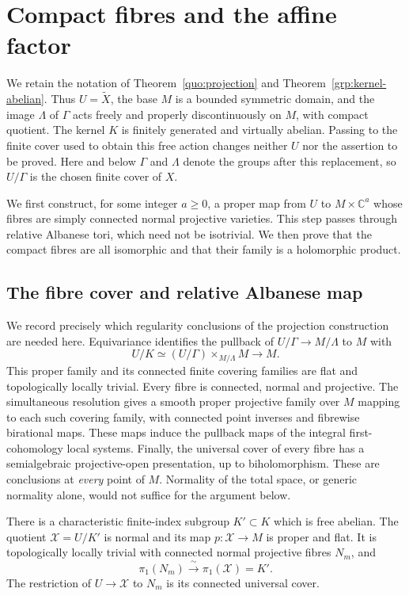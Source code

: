 \section{Compact fibres and the affine factor}
\label{cmp:section}

We retain the notation of Theorem~\ref{quo:projection} and
Theorem~\ref{grp:kernel-abelian}.  Thus $U=\widetilde X$, the base $M$ is
a bounded symmetric domain, and the image $\Lambda$ of $\Gamma$ acts
freely and properly discontinuously on $M$, with compact quotient.
The kernel $K$ is finitely generated and virtually abelian.  Passing to
the finite cover used to obtain this free action changes neither $U$
nor the assertion to be proved.  Here and below $\Gamma$ and $\Lambda$
denote the groups after this replacement, so $U/\Gamma$ is the chosen
finite cover of $X$.

We first construct, for some integer $a\geq0$, a proper map from $U$
to $M\times\mathbb C^a$ whose fibres are simply connected normal
projective varieties.  This step passes through relative Albanese
tori, which need not be
isotrivial.  We then prove that the compact fibres are all isomorphic
and that their family is a holomorphic product.

\subsection{The fibre cover and relative Albanese map}

We record precisely which regularity conclusions of the projection
construction are needed here.  Equivariance identifies the pullback
of $U/\Gamma\to M/\Lambda$ to $M$ with
\[
       U/K\simeq (U/\Gamma)\times_{M/\Lambda}M\longrightarrow M.
\]
This proper family and its connected finite covering families are flat and
topologically locally trivial.  Every fibre is connected, normal and
projective.  The simultaneous resolution gives a smooth proper
projective family over
$M$ mapping to each such covering family, with connected point inverses
and fibrewise birational maps.  These maps induce the pullback maps of
the integral first-cohomology local systems.  Finally, the universal
cover of every fibre has a semialgebraic projective-open presentation, up to
biholomorphism.  These are conclusions at \emph{every} point of $M$.
Normality of the total space, or generic normality alone, would not
suffice for the argument below.

\begin{lemma}
\label{cmp:characteristic}
There is a characteristic finite-index subgroup $K'\subset K$ which
is free abelian.  The quotient $\mathcal X=U/K'$ is normal and its map
$p:\mathcal X\to M$ is proper and flat.  It is topologically locally
trivial with connected normal projective fibres $N_m$, and
\[
          \pi_1(N_m)\xrightarrow{\ \sim\ }\pi_1(\mathcal X)=K'.
\]
The restriction of $U\to\mathcal X$ to $N_m$ is its connected universal
cover.
\end{lemma}

